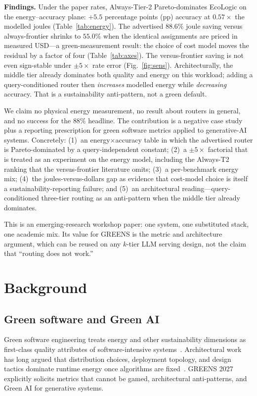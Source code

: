 \documentclass[10pt,conference]{IEEEtran}
\begin{document}
\textbf{Findings.} Under the paper rates, Always-Tier-2 Pareto-dominates EcoLogic on the energy--accuracy plane: $+5.5$ percentage points (pp) accuracy at $0.57\times$ the modelled joules (Table~\ref{tab:energy}). The advertised $88.6\%$ joule saving versus always-frontier shrinks to $55.0\%$ when the identical assignments are priced in measured USD---a green-measurement result: the choice of cost model moves the residual by a factor of four (Table~\ref{tab:axes}). The versus-frontier saving is not even sign-stable under $\pm5\times$ rate error (Fig.~\ref{fig:sens}). Architecturally, the middle tier already dominates both quality and energy on this workload; adding a query-conditioned router then \emph{increases} modelled energy while \emph{decreasing} accuracy. That is a sustainability anti-pattern, not a green default.

We claim no physical energy measurement, no result about routers in general, and no success for the $88\%$ headline. The contribution is a negative case study plus a reporting prescription for green software metrics applied to generative-AI systems. Concretely: (1)~an energy$\times$accuracy table in which the advertised router is Pareto-dominated by a query-independent constant; (2)~a $\pm5\times$ factorial that is treated as an experiment on the energy model, including the Always-T2 ranking that the versus-frontier literature omits; (3)~a per-benchmark energy mix; (4)~the joules-versus-dollars gap as evidence that cost-model choice is itself a sustainability-reporting failure; and (5)~an architectural reading---query-conditioned three-tier routing as an anti-pattern when the middle tier already dominates.

This is an emerging-research workshop paper: one system, one substituted stack, one academic mix. Its value for GREENS is the metric and architecture argument, which can be reused on any $k$-tier LLM serving design, not the claim that ``routing does not work.''

\section{Background}

\subsection{Green software and Green AI}

Green software engineering treats energy and other sustainability dimensions as first-class quality attributes of software-intensive systems~\cite{naumann2011greensoft,lago2015framing,calero2015green,calero2021green}. Architectural work has long argued that distribution choices, deployment topology, and design tactics dominate runtime energy once algorithms are fixed~\cite{procaccianti2015green,jagroep2017energy,capilla2024architecture,cruz2021energy}. GREENS 2027 explicitly solicits metrics that cannot be gamed, architectural anti-patterns, and Green AI for generative systems.
\end{document}
